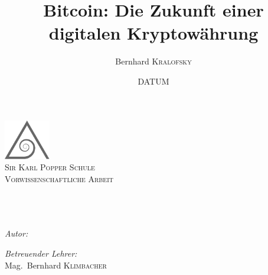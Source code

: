 \title{Bitcoin: Die Zukunft einer digitalen Kryptowährung}
\author{Bernhard \textsc{Kralofsky}}
\date{DATUM}

\begin{titlepage}
\begin{center}

\includegraphics[width=0.15\textwidth]{img/logo}\\[1cm]    
\textsc{\LARGE Sir Karl Popper Schule}\\[1.5cm]

\textsc{\Large Vorwissenschaftliche Arbeit}\\[0.5cm]
\HRule \\[0.4cm]
{ \huge \bfseries \@title}\\[0.1cm]
\HRule \\[1cm]

\begin{minipage}{0.4\textwidth}
\begin{flushleft} \large
\emph{Autor:}\\
\@author
\end{flushleft}
\end{minipage}
\hfill
\begin{minipage}{0.4\textwidth}
\begin{flushright} \large
\emph{Betreuender Lehrer:} \\
Mag.~Bernhard \textsc{Klimbacher}
\end{flushright}
\end{minipage}

\vfill
{\large \@date}

\end{center}
\end{titlepage}